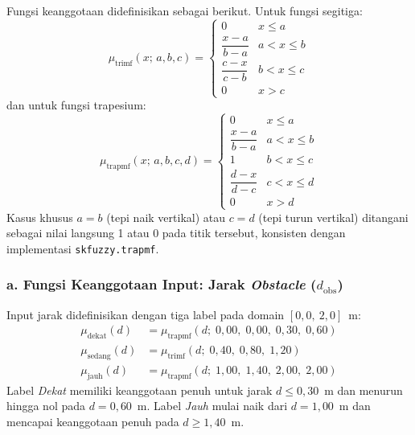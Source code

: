 Fungsi keanggotaan didefinisikan sebagai berikut. Untuk fungsi segitiga:
\begin{equation}
    \mu_\text{trimf}(x;\,a,b,c) =
    \begin{cases}
        0 & x \leq a \\
        \dfrac{x - a}{b - a} & a < x \leq b \\[6pt]
        \dfrac{c - x}{c - b} & b < x \leq c \\
        0 & x > c
    \end{cases}
    \label{eq:trimf}
\end{equation}
dan untuk fungsi trapesium:
\begin{equation}
    \mu_\text{trapmf}(x;\,a,b,c,d) =
    \begin{cases}
        0 & x \leq a \\
        \dfrac{x - a}{b - a} & a < x \leq b \\[4pt]
        1 & b < x \leq c \\[4pt]
        \dfrac{d - x}{d - c} & c < x \leq d \\
        0 & x > d
    \end{cases}
    \label{eq:trapmf}
\end{equation}
Kasus khusus $a = b$ (tepi naik vertikal) atau $c = d$ (tepi turun vertikal) ditangani sebagai nilai langsung 1 atau 0 pada titik tersebut, konsisten dengan implementasi \texttt{skfuzzy.trapmf}.

\subsubsection*{a. Fungsi Keanggotaan Input: Jarak \textit{Obstacle} ($d_\text{obs}$)}

Input jarak didefinisikan dengan tiga label pada domain $[0{,}0,\ 2{,}0]$~m:
\begin{align}
    \mu_\text{dekat}(d)  &= \mu_\text{trapmf}(d;\;0{,}00,\;0{,}00,\;0{,}30,\;0{,}60) \label{eq:mf_dekat} \\
    \mu_\text{sedang}(d) &= \mu_\text{trimf}(d;\;0{,}40,\;0{,}80,\;1{,}20)           \label{eq:mf_sedang_d} \\
    \mu_\text{jauh}(d)   &= \mu_\text{trapmf}(d;\;1{,}00,\;1{,}40,\;2{,}00,\;2{,}00) \label{eq:mf_jauh}
\end{align}
Label \textit{Dekat} memiliki keanggotaan penuh untuk jarak $d \leq 0{,}30$~m dan menurun hingga nol pada $d = 0{,}60$~m. Label \textit{Jauh} mulai naik dari $d = 1{,}00$~m dan mencapai keanggotaan penuh pada $d \geq 1{,}40$~m.

